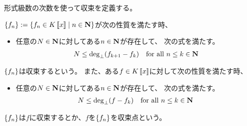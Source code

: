 {	形式級数の次数を使って収束を定義する。

	\begin{definition}[形式級数の収束]\label{def:形式級数の収束} %
		$\mathinner{\left\{{f_n}\right\}}:=\mathinner{\left\{{f_n\in K\mathinner{[\![{x}]\!]}\mid n\in\ensuremath{\mathbf{N}}}\right\}}$が次の性質を満たす時、
		\begin{itemize}\setlength{\itemsep}{-1mm} %
			\item 任意の$N\in\mathbf{N}$に対してある$n\in\mathbf{N}$が存在して、
			次の式を満たす。
			\begin{equation*}\begin{split}
				N\le \deg_\bot(f_{k+1} - f_k) \quad\text{for all } n\le k\in\mathbf{N}
			\end{split}\end{equation*}
		\end{itemize} %
		$\mathinner{\left\{{f_n}\right\}}$は収束するという。
		また、ある$f\in K\mathinner{[\![{x}]\!]}$に対して次の性質を満たす時、
		\begin{itemize}\setlength{\itemsep}{-1mm} %
			\item 任意の$N\in\mathbf{N}$に対してある$n\in\mathbf{N}$が存在して、
			次の式を満たす。
			\begin{equation*}\begin{split}
				N\le \deg_\bot(f - f_k) \quad\text{for all } n\le k\in\mathbf{N}
			\end{split}\end{equation*}
		\end{itemize} %
		$\mathinner{\left\{{f_n}\right\}}$は$f$に収束するとか、$f$を$\mathinner{\left\{{f_n}\right\}}$を収束点という。\EOP
	\end{definition} %

}
